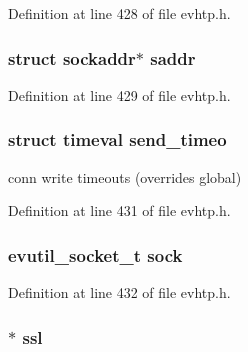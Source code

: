 \-Definition at line 428 of file evhtp.\-h.

\hypertarget{structevhtp__connection__s_a95957a2d67e88843dae4b71c658b6ecb}{
\subsubsection[{saddr}]{\setlength{\rightskip}{0pt plus 5cm}struct sockaddr$\ast$ {\bf saddr}}}\label{structevhtp__connection__s_a95957a2d67e88843dae4b71c658b6ecb}


\-Definition at line 429 of file evhtp.\-h.

\hypertarget{structevhtp__connection__s_a7ffa291d73974047489f8880e5363603}{
\subsubsection[{send\-\_\-timeo}]{\setlength{\rightskip}{0pt plus 5cm}struct timeval {\bf send\-\_\-timeo}}}\label{structevhtp__connection__s_a7ffa291d73974047489f8880e5363603}
conn write timeouts (overrides global) 

\-Definition at line 431 of file evhtp.\-h.

\hypertarget{structevhtp__connection__s_a7544570bf388a535223a1e8e1b2301ac}{
\subsubsection[{sock}]{\setlength{\rightskip}{0pt plus 5cm}evutil\-\_\-socket\-\_\-t {\bf sock}}}\label{structevhtp__connection__s_a7544570bf388a535223a1e8e1b2301ac}


\-Definition at line 432 of file evhtp.\-h.

\hypertarget{structevhtp__connection__s_a9d5e6d2a2098e174347708a6d561b2ec}{
\subsubsection[{ssl}]{$\ast$ {\bf ssl}}}\label{structevhtp__connection__s_a9d5e6d2a2098e174347708a6d561b2ec}


